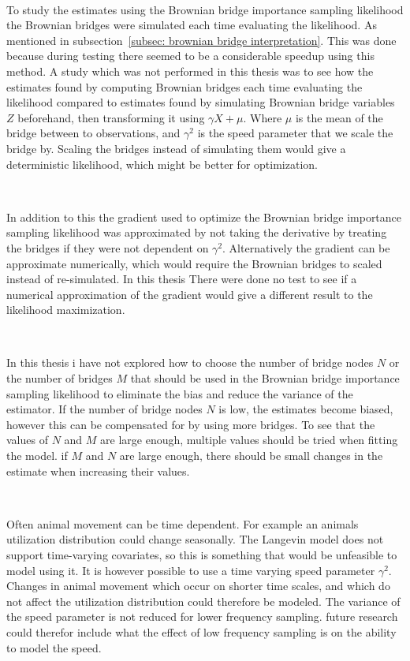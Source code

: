\

To study the estimates using the Brownian bridge importance sampling likelihood the Brownian bridges were simulated each time evaluating the likelihood. As mentioned in subsection~\ref{subsec: brownian bridge interpretation}. This was done because during testing there seemed to be a considerable speedup using this method. A study which was not performed in this thesis was to see how the estimates found by computing Brownian bridges each time evaluating the likelihood compared to estimates found by simulating Brownian bridge variables $Z$ beforehand, then transforming it using $\gamma X +\mu$. Where $\mu$ is the mean of the bridge between to observations, and $\gamma^2$ is the speed parameter that we scale the bridge by. Scaling the bridges instead of simulating them would give a deterministic likelihood, which might be better for optimization.

\

In addition to this the gradient used to optimize the Brownian bridge importance sampling likelihood was approximated by not taking the derivative by treating the bridges if they were not dependent on $\gamma^2$. Alternatively the gradient can be approximate numerically, which would require the Brownian bridges to scaled instead of re-simulated. In this thesis There were done no test to see if a numerical approximation of the gradient would give a different result to the likelihood maximization.

\

In this thesis i have not explored how to choose the number of bridge nodes $N$ or the number of bridges $M$ that should be used in the Brownian bridge importance sampling likelihood to eliminate the bias and reduce the variance of the estimator. If the number of bridge nodes $N$ is low, the estimates become biased,  however this can be compensated for by using more bridges. To see that the values of $N$ and $M$ are large enough, multiple values should be tried when fitting the model. if $M$ and $N$ are large enough, there should be small changes in the estimate when increasing their values. 

\

Often animal movement can be time dependent. For example an animals utilization distribution could change seasonally. The Langevin model does not support time-varying covariates, so this is something that would be unfeasible to model using it. It is however possible to use a time varying speed parameter $\gamma^2$. Changes in animal movement which occur on shorter time scales, and which do not affect the utilization distribution could therefore be modeled. The variance of the speed parameter is not reduced for lower frequency sampling. future research could therefor include what the effect of low frequency sampling is on the ability to model the speed.

